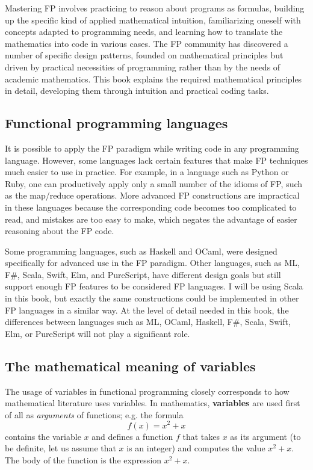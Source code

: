 Mastering FP involves practicing to reason about programs as formulas,
building up the specific kind of applied mathematical intuition, familiarizing
oneself with concepts adapted to programming needs, and learning how
to translate the mathematics into code in various cases. The FP community
has discovered a number of specific design patterns, founded on mathematical
principles but driven by practical necessities of programming rather
than by the needs of academic mathematics. This book explains the
required mathematical principles in detail, developing them through
intuition and practical coding tasks.

\subsection{Functional programming languages}

It is possible to apply the FP paradigm while writing code in any
programming language. However, some languages lack certain features
that make FP techniques much easier to use in practice. For example,
in a language such as Python or Ruby, one can productively apply only
a small number of the idioms of FP, such as the map/reduce operations.
More advanced FP constructions are impractical in these languages
because the corresponding code becomes too complicated to read, and
mistakes are too easy to make, which negates the advantage of easier
reasoning about the FP code.

Some programming languages, such as Haskell and OCaml, were designed
specifically for advanced use in the FP paradigm. Other languages,
such as ML, F\#, Scala, Swift, Elm, and PureScript, have different
design goals but still support enough FP features to be considered
FP languages. I will be using Scala in this book, but exactly the
same constructions could be implemented in other FP languages in a
similar way. At the level of detail needed in this book, the differences
between languages such as ML, OCaml, Haskell, F\#, Scala, Swift, Elm,
or PureScript will not play a significant role.

\subsection{The mathematical meaning of variables}

The usage of variables in functional programming closely corresponds
to how mathematical literature uses variables. In mathematics, \textbf{variables}
are used first of all as \emph{arguments} of functions; e.g. the formula
\[
f(x)=x^{2}+x
\]
contains the variable $x$ and defines a function $f$ that takes
$x$ as its argument (to be definite, let us assume that $x$ is an
integer) and computes the value $x^{2}+x$. The body of the function
is the expression $x^{2}+x$. 

